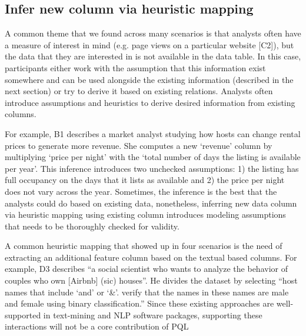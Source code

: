 \documentclass{sig-alternate-05-2015}
\begin{document}
\subsection{Infer new column via heuristic mapping}
 \par A common theme that we found across many scenarios is that analysts often have a measure of interest in mind (e.g. page views on a particular website [C2]), but the data that they are interested in is not available in the data table. In this case, participants either work with the assumption that this information exist somewhere and can be used alongside the existing information (described in the next section) or try to derive it based on existing relations. Analysts often introduce assumptions and heuristics to derive desired information from existing columns. 
 \par For example, B1 describes a market analyst studying how hosts can change rental prices to generate more revenue. She computes a new `revenue' column by multiplying `price per night' with the `total number of days the listing is available per year'. This inference introduces two unchecked assumptions: 1) the listing has full occupancy on the days that it lists as available and 2) the price per night does not vary across the year. Sometimes, the inference is the best that the analysts could do based on existing data, nonetheless, inferring new data column via heuristic mapping using existing column introduces modeling assumptions that needs to be thoroughly checked for validity. 
\par A common heuristic mapping that showed up in four scenarios is the need of extracting an additional feature column based on the textual based columns. For example, D3 describes ``a social scientist who wants to analyze the behavior of couples who own [Airbnb] (sic) houses''. He divides the dataset by selecting ``host names that include `and' or `\&'. verify that the names in these names are male and female using binary classification.'' Since these existing approaches are well-supported in text-mining and NLP software packages, supporting these interactions will not be a core contribution of PQL 
\end{document}
